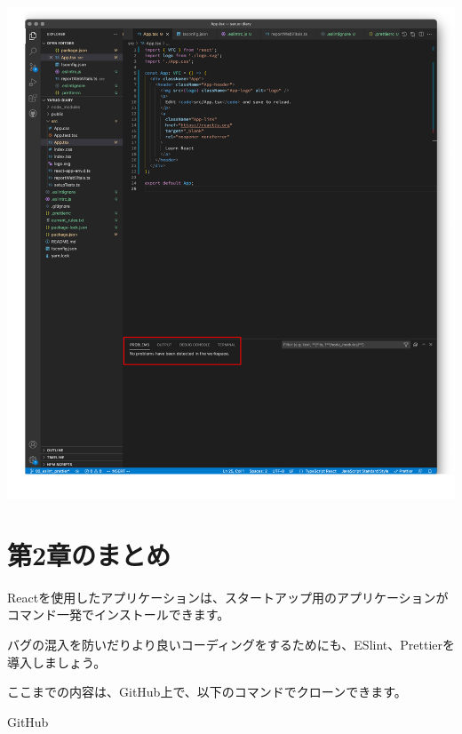 \begin{reviewimage}[H]%
\includegraphics[width=1.0\maxwidth]{./images/02-create-react-app/06_eslint_prettier_fixdoneAll.png}%
\label{image:02-create-react-app:06_eslint_prettier_fixdoneAll}
\end{reviewimage}

\section{第2章のまとめ}
\keeplastskip{
  \label{sec:2-5}
  \label{sec-chap02review}
  \par\nobreak
}

Reactを使用したアプリケーションは、スタートアップ用のアプリケーションがコマンド一発でインストールできます。

\vspace*{\baselineskip}

バグの混入を防いだりより良いコーディングをするためにも、ESlint、Prettierを導入しましょう。

\begin{starternote}[]{}

ここまでの内容は、GitHub上で、以下のコマンドでクローンできます。

\def\startercodeblockfontsize{}
\begin{starterterminal}[]{GitHub}\end{starterterminal}
\end{starternote}
